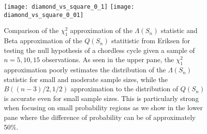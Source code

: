 \begin{figure}[!tbp]
    \centering
    \texttt{[image: diamond\_vs\_square\_0\_1]}
    \newline
    \newline
    \newline
    \texttt{[image: diamond\_vs\_square\_0\_01]}
    \caption{Comparison of the $\chi^2_1$ approximation of the $\Lambda(S_n)$ statistic and Beta approximation of the $Q(S_n)$ statitistic from Eriksen \cite{eriksen1996tests} for testing the null hypothesis of a chordless cycle given a sample of $n = 5, 10, 15$ observations. As seen in the upper pane, the $\chi^2_1$ approximation poorly estimates the distribution of the $\Lambda(S_n)$ statistic for small and moderate sample sizes, while the $B((n - 3)/2, 1/2)$ approximation to the distribution of $Q(S_n)$ is accurate even for small sample sizes. This is particularly strong when focusing on small probability regions as we show in the lower pane where the difference of probability can be of approximately 50\%.}
    \label{fig-diamond-vs-square-small}
\end{figure}
